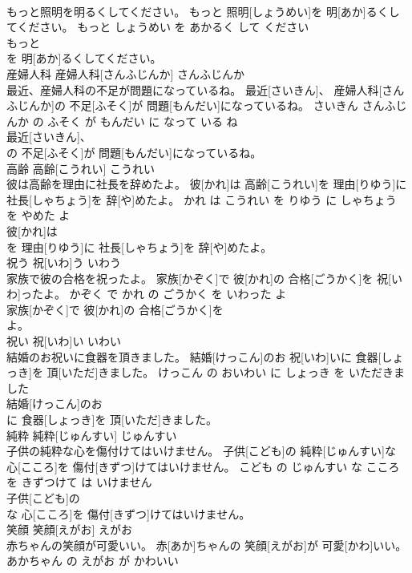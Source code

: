 \documentclass[8pt]{extreport}
\begin{document}
\begin{CJK}{UTF8}{min}
\\	もっと照明を明るくしてください。	もっと 照明[しょうめい]を 明[あか]るくしてください。	もっと しょうめい を あかるく して ください	
\\	もっと
\\	を 明[あか]るくしてください。			
\\	産婦人科	産婦人科[さんふじんか]	さんふじんか	
\\	最近、産婦人科の不足が問題になっているね。	最近[さいきん]、 産婦人科[さんふじんか]の 不足[ふそく]が 問題[もんだい]になっているね。	さいきん さんふじんか の ふそく が もんだい に なって いる ね	
\\	最近[さいきん]、
\\	の 不足[ふそく]が 問題[もんだい]になっているね。			
\\	高齢	高齢[こうれい]	こうれい	
\\	彼は高齢を理由に社長を辞めたよ。	彼[かれ]は 高齢[こうれい]を 理由[りゆう]に 社長[しゃちょう]を 辞[や]めたよ。	かれ は こうれい を りゆう に しゃちょう を やめた よ	
\\	彼[かれ]は
\\	を 理由[りゆう]に 社長[しゃちょう]を 辞[や]めたよ。			
\\	祝う	祝[いわ]う	いわう	
\\	家族で彼の合格を祝ったよ。	家族[かぞく]で 彼[かれ]の 合格[ごうかく]を 祝[いわ]ったよ。	かぞく で かれ の ごうかく を いわった よ	
\\	家族[かぞく]で 彼[かれ]の 合格[ごうかく]を
\\	よ。			
\\	祝い	祝[いわ]い	いわい	
\\	結婚のお祝いに食器を頂きました。	結婚[けっこん]のお 祝[いわ]いに 食器[しょっき]を 頂[いただ]きました。	けっこん の おいわい に しょっき を いただきました	
\\	結婚[けっこん]のお
\\	に 食器[しょっき]を 頂[いただ]きました。			
\\	純粋	純粋[じゅんすい]	じゅんすい	
\\	子供の純粋な心を傷付けてはいけません。	子供[こども]の 純粋[じゅんすい]な 心[こころ]を 傷付[きずつ]けてはいけません。	こども の じゅんすい な こころ を きずつけて は いけません	
\\	子供[こども]の
\\	な 心[こころ]を 傷付[きずつ]けてはいけません。			
\\	笑顔	笑顔[えがお]	えがお	
\\	赤ちゃんの笑顔が可愛いい。	赤[あか]ちゃんの 笑顔[えがお]が 可愛[かわ]いい。	あかちゃん の えがお が かわいい	

\end{CJK}
\end{document}

